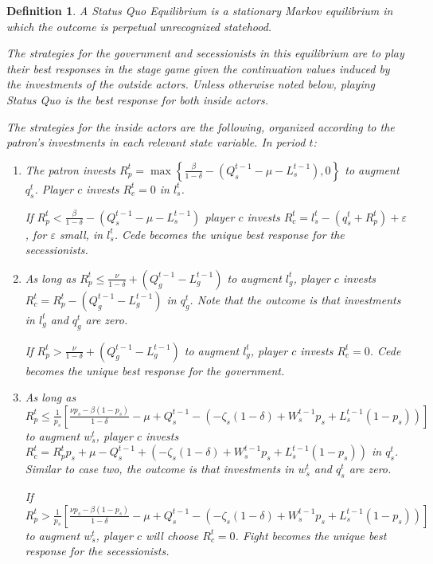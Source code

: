 \documentclass[11pt,letterpaper, notitlepage]{article}
\newtheorem{definition}{Definition}
\newcommand{\de}{\delta}
\newcommand{\ve}{\varepsilon}
\begin{document}
\begin{definition}
A Status Quo Equilibrium is a stationary Markov equilibrium in which the outcome is perpetual unrecognized statehood.

The strategies for the government and secessionists in this equilibrium are to play their best responses in the stage game given the continuation values induced by the investments of the outside actors. Unless otherwise noted below, playing Status Quo is the best response for both inside actors.

The strategies for the inside actors are the following, organized according to the patron's investments in each relevant state variable. In period $t$:

\begin{enumerate}
	\item The patron invests $R_p^t = \max\left\{\frac{\beta}{1-\de} - \left( Q_s^{t-1} - \mu - L_s^{t-1}\right),0\right\}$ to augment $q_s^t$. Player $c$ invests $R_c^t =0$ in $l_s^t$.

If $R_p^t < \frac{\beta}{1-\de} - \left( Q_s^{t-1} - \mu - L_s^{t-1}\right)$ player $c$ invests $R_c^t = l_s^t - \left(q_s^t + R_p^t \right) + \ve$, for $\ve$ small, in $l_s^t$. Cede becomes the unique best response for the secessionists.

	\item As long as $R_p^t \leq \frac{\nu}{1-\de} + \left( Q_g^{t-1} - L_g^{t-1}\right)$ to augment $l_g^t$, player $c$ invests $R_c^t = R_p^t - \left( Q_g^{t-1} - L_g^{t-1}\right)$ in $q_g^t$. Note that the outcome is that investments in $l_g^t$ and $q_g^t$ are zero.

If $R_p^t > \frac{\nu}{1-\de} + \left( Q_g^{t-1} - L_g^{t-1}\right)$ to augment $l_g^t$, player $c$ invests $R_c^t = 0$. Cede becomes the unique best response for the government.

	\item As long as $R_p^t \leq \frac{1}{p_s} \left[\frac{\nu p_s - \beta (1-p_s)}{1 -\de} - \mu + Q_s^{t-1} - \left(-\zeta_{s}(1-\de) + W_s^{t-1}p_s + L_s^{t-1}(1-p_s)\right)\right]$ to augment $w_s^t$, player $c$ invests $R_c^t = R_p^tp_s + \mu - Q_s^{t-1} + \left(-\zeta_{s}(1-\de) + W_s^{t-1}p_s + L_s^{t-1}(1-p_s)\right)$ in $q_s^t$. Similar to case two, the outcome is that investments in $w_s^t$ and $q_s^t$ are zero.

If $R_p^t > \frac{1}{p_s}\left[\frac{\nu p_s - \beta (1-p_s)}{1 -\de} - \mu + Q_s^{t-1} - \left(-\zeta_{s}(1-\de) + W_s^{t-1}p_s + L_s^{t-1}(1-p_s)\right)\right] $ to augment $w_s^t$, player $c$ will choose $R_c^t=0$. Fight becomes the unique best response for the secessionists.
\end{enumerate}
\end{definition}
\end{document}

